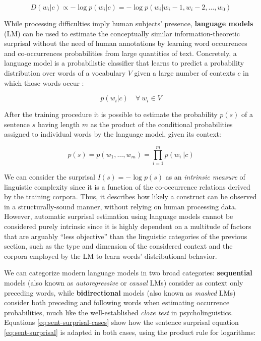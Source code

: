 \documentclass[a4paper, nobind]{templates/ociamthesis}
\begin{document}
\begin{equation}
D(w_i|c) \propto -\log p(w_i|c) = -\log p(w_i|w_i-1, w_i-2,\dots, w_0)
\end{equation}

While processing difficulties imply human subjects' presence, \textbf{language models} (LM) can be used to estimate the conceptually similar information-theoretic surprisal without the need of human annotations by learning word occurrences and co-occurrences probabilities from large quantities of text. Concretely, a language model is a probabilistic classifier that learns to predict a probability distribution over words of a vocabulary \(V\) given a large number of contexts \(c\) in which those words occur \autocite{goodman-2001-bit}:

\begin{equation}
p(w_i|c) \quad \forall\ w_i\in V
\end{equation}

After the training procedure it is possible to estimate the probability \(p(s)\) of a sentence \(s\) having length \(m\) as the product of the conditional probabilities assigned to individual words by the language model, given its context:

\begin{equation}
p(s) = p(w_1, \dots, w_m) = \prod_{i=1}^m p(w_i \ |c)
\label{eq:sent-surprisal}
\end{equation}

We can consider the surprisal \(I(s) = -\log p(s)\) as an \emph{intrinsic measure} of linguistic complexity since it is a function of the co-occurrence relations derived by the training corpora. Thus, it describes how likely a construct can be observed in a structurally-sound manner, without relying on human processing data. However, automatic surprisal estimation using language models cannot be considered purely intrinsic since it is highly dependent on a multitude of factors that are arguably ``less objective'' than the linguistic categories of the previous section, such as the type and dimension of the considered context and the corpora employed by the LM to learn words' distributional behavior.

We can categorize modern language models in two broad categories: \textbf{sequential} models (also known as \emph{autoregressive} or \emph{causal} LMs) consider as context only preceding words, while \textbf{bidirectional} models (also known as \emph{masked} LMs) consider both preceding and following words when estimating occurrence probabilities, much like the well-established \emph{cloze test} \autocite{taylor-1953-cloze} in psycholinguistics. Equations \eqref{eq:sent-surprisal-cases} show how the sentence surprisal equation \eqref{eq:sent-surprisal} is adapted in both cases, using the product rule for logarithms:
\end{document}
